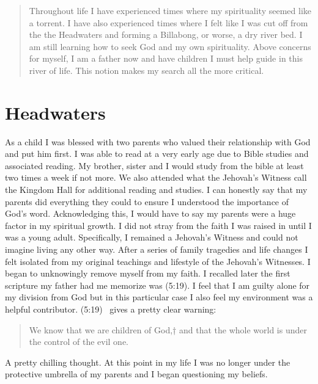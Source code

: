\documentclass[11pt,a4paper]{scrartcl} %
\begin{document}
    \begin{abstract}
Throughout life I have experienced times where my spirituality seemed like a torrent. I have also experienced times where I felt like I was cut off from the the Headwaters and forming a Billabong, or worse, a dry river bed. I am still learning how to seek God and my own spirituality. Above concerns for myself, I am a father now and have children I must help guide in this river of life. This notion makes my search all the more critical.
    \end{abstract}
       
\tableofcontents
    
\section{Headwaters}
\begin{doublespace}
As a child I was blessed with two parents who valued their relationship with God and put him first. I was able to read at a very early age due to Bible studies and associated reading. My brother, sister and I would study from the bible at least two times a week if not more. We also attended what the Jehovah's Witness call the Kingdom Hall for additional reading and studies. I can honestly say that my parents did everything they could to ensure I understood the importance of God's word. Acknowledging this, I would have to say my parents were a huge factor in my spiritual growth. I did not stray from the faith I was raised in until I was a young adult. Specifically, I remained a Jehovah's Witness and could not imagine living any other way. After a series of family tragedies and life changes I felt isolated from my original teachings and lifestyle of the Jehovah's Witnesses.  I began to unknowingly remove myself from my faith. I recalled later the first scripture my father had me memorize was (5:19). I feel that I am guilty alone for my division from God but in this particular case I also feel my environment was a helpful contributor. (5:19)~\citep{niv} gives a pretty clear warning:
\begin{verse}
We know that we are children of God,† and that the whole world is under the control of the evil one.
\end{verse}
A pretty chilling thought. At this point in my life I was no longer under the protective umbrella of my parents and I began questioning my beliefs.
\end{doublespace}
\end{document}
